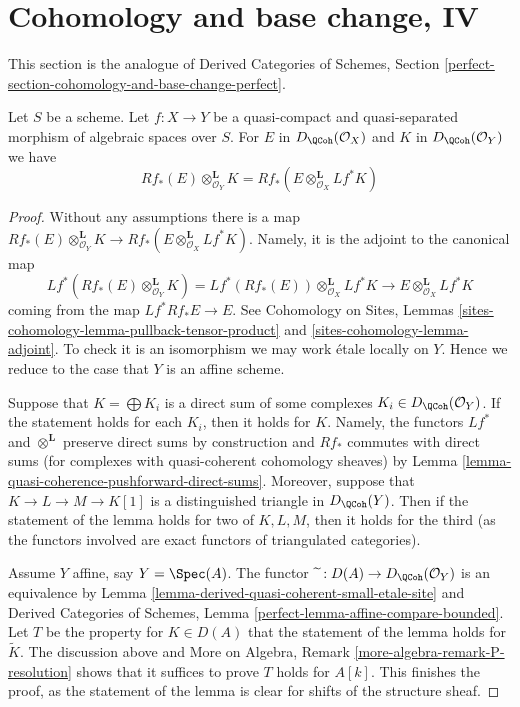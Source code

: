 \section{Cohomology and base change, IV}
\label{section-cohomology-and-base-change-perfect}

\noindent
This section is the analogue of Derived Categories of Schemes, Section
\ref{perfect-section-cohomology-and-base-change-perfect}.

\begin{lemma}
\label{lemma-cohomology-base-change}
Let $S$ be a scheme. Let $f : X \to Y$ be a quasi-compact and quasi-separated
morphism of algebraic spaces over $S$. For $E$ in
$D_\QCoh(\mathcal{O}_X)$ and
$K$ in $D_\QCoh(\mathcal{O}_Y)$ we have
$$
Rf_*(E) \otimes_{\mathcal{O}_Y}^\mathbf{L} K =
Rf_*(E \otimes_{\mathcal{O}_X}^\mathbf{L} Lf^*K)
$$
\end{lemma}

\begin{proof}
Without any assumptions there is a map
$Rf_*(E) \otimes_{\mathcal{O}_Y}^\mathbf{L} K \to
Rf_*(E \otimes_{\mathcal{O}_X}^\mathbf{L} Lf^*K)$.
Namely, it is the adjoint to the canonical map
$$
Lf^*(Rf_*(E) \otimes_{\mathcal{O}_Y}^\mathbf{L} K) =
Lf^*(Rf_*(E)) \otimes_{\mathcal{O}_X}^\mathbf{L} Lf^*K
\longrightarrow
E \otimes_{\mathcal{O}_X}^\mathbf{L} Lf^*K
$$
coming from the map $Lf^*Rf_*E \to E$. See
Cohomology on Sites, Lemmas
\ref{sites-cohomology-lemma-pullback-tensor-product} and
\ref{sites-cohomology-lemma-adjoint}.
To check it is an isomorphism we may work \'etale locally on $Y$.
Hence we reduce to the case that $Y$ is an affine scheme.

\medskip\noindent
Suppose that $K = \bigoplus K_i$ is a direct
sum of some complexes $K_i \in D_\QCoh(\mathcal{O}_Y)$.
If the statement holds for each $K_i$, then it holds for $K$.
Namely, the functors $Lf^*$ and $\otimes^\mathbf{L}$ preserve
direct sums by construction and $Rf_*$ commutes with direct sums
(for complexes with quasi-coherent cohomology sheaves) by
Lemma \ref{lemma-quasi-coherence-pushforward-direct-sums}.
Moreover, suppose that $K \to L \to M \to K[1]$ is a distinguished
triangle in $D_\QCoh(Y)$. Then if the statement of the
lemma holds for two of $K, L, M$, then it holds for the third
(as the functors involved are exact functors of triangulated categories).

\medskip\noindent
Assume $Y$ affine, say $Y = \Spec(A)$. The functor
$\widetilde{\ } : D(A) \to D_\QCoh(\mathcal{O}_Y)$ is an equivalence
by
Lemma \ref{lemma-derived-quasi-coherent-small-etale-site} and
Derived Categories of Schemes,
Lemma \ref{perfect-lemma-affine-compare-bounded}.
Let $T$ be the property for $K \in D(A)$ that
the statement of the lemma holds for $\widetilde{K}$.
The discussion above and
More on Algebra, Remark \ref{more-algebra-remark-P-resolution}
shows that it suffices to prove $T$ holds for $A[k]$.
This finishes the proof, as the statement of the lemma
is clear for shifts of the structure sheaf.
\end{proof}

